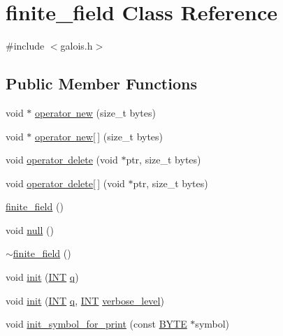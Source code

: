 \hypertarget{classfinite__field}{}\section{finite\+\_\+field Class Reference}
\label{classfinite__field}


{\ttfamily \#include $<$galois.\+h$>$}

\subsection*{Public Member Functions}
\begin{DoxyCompactItemize}
\item 
void $\ast$ \mbox{\hyperlink{classfinite__field_a5f85af83c9bb1107259f776e55f001bc}{operator new}} (size\+\_\+t bytes)
\item 
void $\ast$ \mbox{\hyperlink{classfinite__field_adf3ff56d45f8d0490f6568f8ebebe578}{operator new\mbox{[}$\,$\mbox{]}}} (size\+\_\+t bytes)
\item 
void \mbox{\hyperlink{classfinite__field_a1af67579ce54f25fb9739fe865a17874}{operator delete}} (void $\ast$ptr, size\+\_\+t bytes)
\item 
void \mbox{\hyperlink{classfinite__field_a5905465b6cb57fbc0dd32740903ad2e5}{operator delete\mbox{[}$\,$\mbox{]}}} (void $\ast$ptr, size\+\_\+t bytes)
\item 
\mbox{\hyperlink{classfinite__field_a281895137edaefacfe249ad94014b606}{finite\+\_\+field}} ()
\item 
void \mbox{\hyperlink{classfinite__field_aa0998ab3b5bf130864902630ecefb91d}{null}} ()
\item 
\mbox{\hyperlink{classfinite__field_a1308cdc4d891df0b18e0ed87ba29cd96}{$\sim$finite\+\_\+field}} ()
\item 
void \mbox{\hyperlink{classfinite__field_a13e75e8165b27464935b50368ee8313c}{init}} (\mbox{\hyperlink{galois_8h_a09fddde158a3a20bd2dcadb609de11dc}{I\+NT}} \mbox{\hyperlink{classfinite__field_a860fdb72f3e11356476cb0841977c21b}{q}})
\item 
void \mbox{\hyperlink{classfinite__field_af3a64c2b33179e383025e071514bb9cd}{init}} (\mbox{\hyperlink{galois_8h_a09fddde158a3a20bd2dcadb609de11dc}{I\+NT}} \mbox{\hyperlink{classfinite__field_a860fdb72f3e11356476cb0841977c21b}{q}}, \mbox{\hyperlink{galois_8h_a09fddde158a3a20bd2dcadb609de11dc}{I\+NT}} \mbox{\hyperlink{simeon_8_c_a818073fbcc2f439e7c56952f67386122}{verbose\+\_\+level}})
\item 
void \mbox{\hyperlink{classfinite__field_ac3ac8778d3162ccee0b3c5764127a92e}{init\+\_\+symbol\+\_\+for\+\_\+print}} (const \mbox{\hyperlink{galois_8h_ab6cc7b4aeb6ea31aba2b3fbfc83ff5e6}{B\+Y\+TE}} $\ast$symbol)

\end{DoxyCompactItemize}
